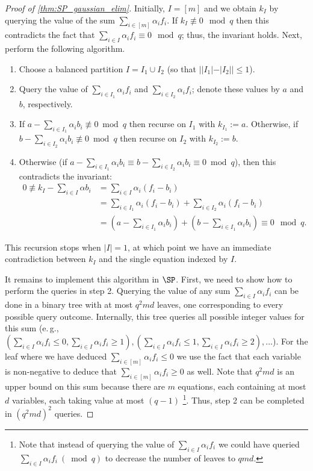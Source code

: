 \documentclass[11pt]{article}
\numberwithin{equation}{section}
\theoremstyle{definition}
\theoremstyle{plain}
\newcommand{\eg}{e.\,g.}
\newcounter{cor}\renewcommand{\thecor}{1.1.\arabic{cor}}\newenvironment{cor}{\ifnum\value{cor}=0\refstepcounter{cor}\else\PackageError{toc-native-compat}{Unsupported additional cor envelope}{Only the one exact source-observed cor paragraph is allowed.}\fi}{}\providecommand{\corautorefname}{Theorem}
\begin{document}
\begin{proof}[Proof of \autoref{thm:SP_gaussian_elim}]
	Initially, $I = [m]$ and we obtain $k_I$ by querying the value of the sum $\sum_{i \in [m]} \alpha_i f_i$. If $k_I \not \equiv 0 \mod q$ then this contradicts the fact that $\sum_{i \in I} \alpha_i f_i \equiv 0 \mod q$; thus, the invariant holds.  Next, perform the following algorithm.
	\begin{enumerate}
		\item Choose a balanced partition $I = I_1 \cup I_2$ (so that $||I_1|-|I_2|| \leq 1$).
		\item Query the value of $\sum_{i \in I_1} \alpha_i f_i$ and $ \sum_{i \in I_2} \alpha_i f_i$; denote these values by $a$ and $b$, respectively.
		\item If $a -\sum_{i \in I_1} \alpha_i b_i \not \equiv 0 \bmod q$ then recurse on $I_1$ with $k_{I_1} := a$. Otherwise, if $b -\sum_{i \in I_2} \alpha_i b_i \not \equiv 0 \bmod q$ then recurse on $I_2$ with $k_{I_2} := b$.
		\item Otherwise (if $a -\sum_{i \in I_1} \alpha_i b_i \equiv b -\sum_{i \in I_2} \alpha_i b_i \equiv 0 \bmod q$), then this contradicts the invariant:
			\begin{align*} 0  \not \equiv k_I - \sum_{i \in I} \alpha b_i
			&= \sum_{i \in I} \alpha_i (f_i-b_i) \\ &= \sum_{i \in I_1} \alpha_i (f_i-b_i) + \sum_{i \in I_2} \alpha_i (f_i-b_i) \\ 
			&= (a-\sum_{i\in I_1} \alpha_ib_i) + (b-\sum_{i\in I_1} \alpha_ib_i) \equiv 0 \mod q.	
			\end{align*}
	\end{enumerate}
	This recursion stops when $|I| = 1$, at which point we have an immediate contradiction between $k_I$ and the single equation indexed by $I$. 
	
	It remains to implement this algorithm in $\SP$. First, we need to show how to perform the queries in step 2. 
	Querying the value of any sum $\sum_{i \in I} \alpha_i f_i$ can be done in a binary tree with at most $q^2md$ leaves, one corresponding to every possible query outcome. Internally, this tree queries all possible integer values for this sum (\eg,  $(\sum_{i \in I} \alpha_i f_i \leq 0, \sum_{i \in I} \alpha_i f_i \geq 1), (\sum_{i \in I} \alpha_i f_i \leq 1, \sum_{i \in I} \alpha_i f_i \geq 2), \ldots$). For the leaf where we have deduced $\sum_{i \in [m]} \alpha_i f_i \leq 0$ we use the fact that each variable is non-negative to deduce that $\sum_{i \in [m]} \alpha_i f_i \geq 0$ as well. 
	Note that $q^2md$ is an upper bound on this sum because there are $m$ equations, each containing at most $d$ variables, each taking value at most $(q-1)$ \footnote{Note that instead of querying the value of $\sum_{i \in I} \alpha_i f_i$ we could have queried $\sum_{i \in I} \alpha_i f_i ~(\bmod q)$ to decrease the number of leaves to $qmd$.}. Thus, step 2 can be completed in $(q^2md)^2$ queries.
	

\end{proof}
\end{document}

